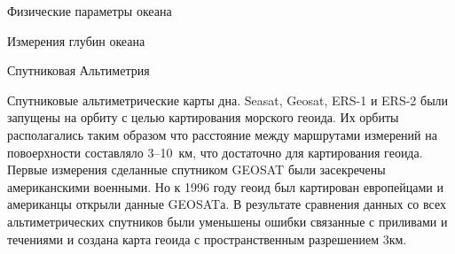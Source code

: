 \begin{chapter}{Физические параметры океана}
\begin{section}{Измерения глубин океана}
\begin{subsection}{Спутниковая Альтиметрия}
\begin{subsubsection}{Спутниковые альтиметрические карты дна.}
Seasat, Geosat, ERS-1 и ERS-2 были запущены на орбиту с целью
картирования морского геоида. Их орбиты располагались таким образом
что расстояние между маршрутами измерений на повоерхности составляло
3--10~км, что достаточно для картирования геоида. Первые измерения
сделанные спутником GEOSAT были засекречены американскими военными. Но
к 1996 году геоид был картирован европейцами и американцы открыли
данные GEOSATа. В результате сравнения данных со всех альтиметрических
спутников были уменьшены ошибки связанные с приливами и течениями и
создана карта геоида с пространственным разрешением 3км.
\end{subsubsection}
% 

\end{subsection}


\end{section}
\end{chapter}
